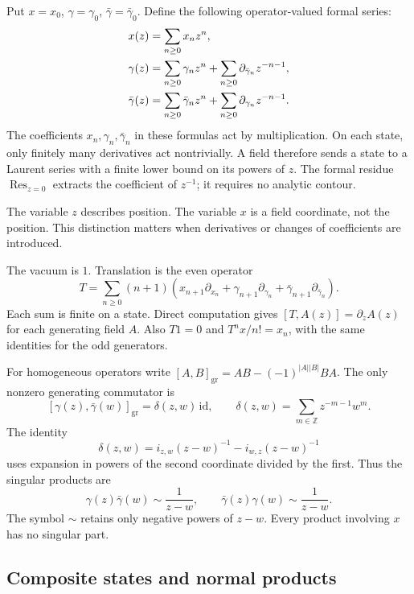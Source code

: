 Put \(x=x_0\), \(\gamma=\gamma_0\), \(\bar\gamma=\bar\gamma_0\).
Define the following operator-valued formal series:
\begin{align}
 x(z)&=\sum_{n\ge0}x_nz^n, \notag\\
 \gamma(z)&=\sum_{n\ge0}\gamma_nz^n+
                    \sum_{n\ge0}\partial_{\bar\gamma_n}z^{-n-1},
       \label{eq:sc050-fields}\\
 \bar\gamma(z)&=\sum_{n\ge0}\bar\gamma_nz^n+
                    \sum_{n\ge0}\partial_{\gamma_n}z^{-n-1}.
       \notag
\end{align}
The coefficients \(x_n,\gamma_n,\bar\gamma_n\) in these formulas act
by multiplication. On each state, only finitely many derivatives act
nontrivially. A field therefore sends a state to a Laurent series
with a finite lower bound on its powers of \(z\).
The formal residue \(\operatorname{Res}_{z=0}\) extracts the
coefficient of \(z^{-1}\); it requires no analytic contour.

The variable \(z\) describes position. The variable \(x\) is a field
coordinate, not the position. This distinction matters when derivatives
or changes of coefficients are introduced.

The vacuum is \(1\). Translation is the even operator
\[
 T=\sum_{n\ge0}(n+1)
 \left(x_{n+1}\partial_{x_n}
       +\gamma_{n+1}\partial_{\gamma_n}
       +\bar\gamma_{n+1}\partial_{\bar\gamma_n}\right).
\]
Each sum is finite on a state. Direct computation gives
\([T,A(z)]=\partial_z A(z)\) for each generating field \(A\).
Also \(T1=0\) and \(T^n x/n!=x_n\), with the same identities for
the odd generators.

For homogeneous operators write
\([A,B]_{\mathrm{gr}}=AB-(-1)^{|A||B|}BA\).
The only nonzero generating commutator is
\[
 [\gamma(z),\bar\gamma(w)]_{\mathrm{gr}}
   =\delta(z,w)\,\mathrm{id},\qquad
 \delta(z,w)=\sum_{m\in\mathbb Z}z^{-m-1}w^m.
\]
The identity
\[
 \delta(z,w)=i_{z,w}(z-w)^{-1}-i_{w,z}(z-w)^{-1}
\]
uses expansion in powers of the second coordinate divided by the
first. Thus the singular products are
\begin{equation}\label{eq:sc050-poles}
 \gamma(z)\bar\gamma(w)\sim\frac1{z-w},\qquad
 \bar\gamma(z)\gamma(w)\sim\frac1{z-w}.
\end{equation}
The symbol \(\sim\) retains only negative powers of \(z-w\).
Every product involving \(x\) has no singular part.

\subsection{Composite states and normal products}

